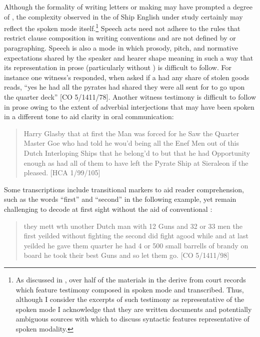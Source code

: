 Although the formality of writing letters or making  may have prompted a degree of , the complexity observed in the  of Ship English under study certainly may reflect the spoken mode itself.\footnote{As discussed in , over half of the materials in the  derive from court records which feature testimony composed in spoken mode and transcribed. Thus, although I consider the excerpts of such testimony as representative of the spoken mode I acknowledge that they are written documents and potentially ambiguous sources with which to discuss syntactic features representative of spoken modality.} Speech acts need not adhere to the rules that restrict clause composition in writing conventions and are not defined by  or paragraphing. Speech is also a mode in which prosody, pitch, and normative expectations shared by the speaker and hearer shape meaning in such a way that its representation in prose (particularly without ) is difficult to follow. For instance one witness’s responded, when asked if a  had any share of stolen goods reads, “yes he had all the pyrates had shared they were all sent for to go upon the quarter deck” [CO 5/1411/78]. Another witness testimony is difficult to follow in prose owing to the extent of adverbial interjections that may have been spoken in a different tone to aid clarity in oral communication:

\begin{quotation}
Harry Glasby that at first the Man was forced for he Saw the Quarter Master Goe who had told he wou’d being all the Enef Men out of this Dutch Interloping Ships that he belong’d to but that he had Opportunity enough as had all of them to have left the Pyrate Ship at Sieraleon if the pleased. [HCA 1/99/105]
\end{quotation}

Some transcriptions include transitional markers to aid reader comprehension, such as the words “first” and “second” in the following example, yet remain challenging to decode at first sight without the aid of conventional : 

\begin{quotation}
they mett wth unother Dutch man with 12 Guns and 32 or 33 men the first yeilded without fighting the second did fight agood while and at last yeilded he gave them quarter he had 4 or 500 small barrells of brandy on board he took their best Guns and so let them go. [CO 5/1411/98]
\end{quotation}

